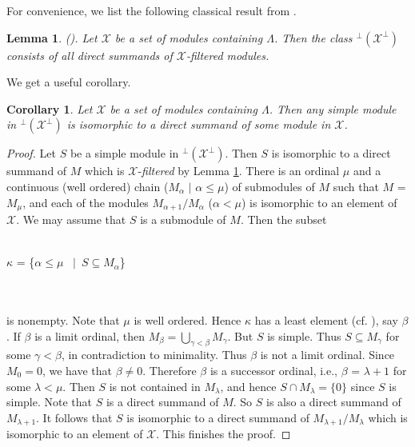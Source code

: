 \documentclass[11pt,a4paper]{article}
\newtheorem{cor}[thm]{Corollary}
\newtheorem{lem}[thm]{Lemma}
\begin{document}
For convenience, we list the following classical result from \cite{gbe}.

\begin{lem}\label{lem2}  {\rm (\cite[Corollary 6.14]{gbe})}. Let   $\mathscr{X}$ be a set of modules containing $\Lambda$.
Then the class  $^\perp(\mathscr{X}^\perp)$ consists of all direct summands of $\mathscr{X}$-filtered modules.
\end{lem}


We get a useful  corollary.

\begin{cor}\label{cor1}   Let   $\mathscr{X}$ be a set of modules containing $\Lambda$.
Then  any   simple module in    $^\perp(\mathscr{X}^\perp)$ is  isomorphic to a  direct summand of some module in $\mathscr{X}$. \end{cor}

\begin{proof} Let  $S$  be a   simple module in    $^\perp(\mathscr{X}^\perp)$. Then $S$    is isomorphic to a  direct summand of $M$ which is  $\mathscr{X}$-{\it filtered} by
Lemma  \ref{lem2}. There is an ordinal $\mu$
   and  a continuous (well ordered) chain ($M_{\alpha} $ $|$ $\alpha \leq \mu$) of submodules  of $M$ such that $M$ = $M_{\mu} $,
    and each of the modules $M_{\alpha + 1}/M_{\alpha}  $  ($\alpha < \mu$) is isomorphic to an element of $\mathscr{X}$.
    We may assume that $S$  is a  submodule  of $M$. Then the subset
 \\
 \\
\centerline{   $\kappa$   = \{$\alpha \leq \mu$  \ $|$\  $S \subseteq M_{\alpha}$\}}
 \\
 \\
 is nonempty. Note that $\mu$ is well ordered. Hence  $\kappa$  has a least element (cf. \cite[Definition 1.1.4]{eno5}), say $\beta$.
 If  $\beta$ is a limit ordinal, then   $M_{\beta} = \bigcup_{\gamma < \beta} M_{\gamma} $. But $S   $ is simple. Thus $S \subseteq M_{\gamma}$ for some
 $\gamma < \beta$, in contradiction to minimality. Thus $\beta$ is not a limit ordinal. Since  $M_{0} = 0$, we have that $ \beta \neq 0$. Therefore $\beta$ is a successor ordinal,
 i.e., $\beta$ = $\lambda + 1$ for some $\lambda < \mu$. Then $S  $ is not contained in  $  M_{\lambda}$, and hence $S \cap M_{\lambda} = \{0\}$ since  $S  $ is simple.
Note that $S$    is   a  direct summand of $M$. So $S$    is also   a  direct summand of $ M_{\lambda + 1}$. It follows that   $S$    is isomorphic to
   a  direct summand of  $M_{\lambda + 1}/M_{\lambda}  $ which is isomorphic to an element of $\mathscr{X}$. This finishes the proof. \end{proof}
\end{document}
